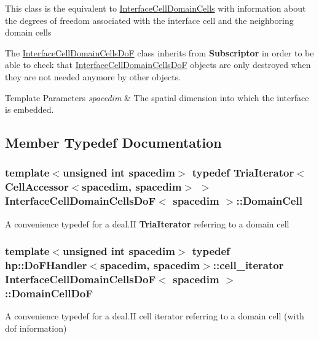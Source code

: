 This class is the equivalent to \hyperlink{class_interface_cell_domain_cells}{Interface\+Cell\+Domain\+Cells} with information about the degrees of freedom associated with the interface cell and the neighboring domain cells

The \hyperlink{class_interface_cell_domain_cells_do_f}{Interface\+Cell\+Domain\+Cells\+DoF} class inherits from {\bf Subscriptor} in order to be able to check that \hyperlink{class_interface_cell_domain_cells_do_f}{Interface\+Cell\+Domain\+Cells\+DoF} objects are only destroyed when they are not needed anymore by other objects.


\begin{DoxyTemplParams}{Template Parameters}
{\em spacedim} & The spatial dimension into which the interface is embedded. \\
\hline
\end{DoxyTemplParams}


\subsection{Member Typedef Documentation}
\subsubsection[{\texorpdfstring{Domain\+Cell}{DomainCell}}]{\setlength{\rightskip}{0pt plus 5cm}template$<$unsigned int spacedim$>$ typedef {\bf Tria\+Iterator}$<${\bf Cell\+Accessor}$<$spacedim, spacedim$>$ $>$ {\bf Interface\+Cell\+Domain\+Cells\+DoF}$<$ spacedim $>$\+::{\bf Domain\+Cell}}\hypertarget{class_interface_cell_domain_cells_do_f_a0d0b12a444adb340e1ffc2dd23d77902}{}\label{class_interface_cell_domain_cells_do_f_a0d0b12a444adb340e1ffc2dd23d77902}
A convenience typedef for a deal.\+II {\bf Tria\+Iterator} referring to a domain cell 
\subsubsection[{\texorpdfstring{Domain\+Cell\+DoF}{DomainCellDoF}}]{\setlength{\rightskip}{0pt plus 5cm}template$<$unsigned int spacedim$>$ typedef {\bf hp\+::\+Do\+F\+Handler}$<$spacedim, spacedim$>$\+::{\bf cell\+\_\+iterator} {\bf Interface\+Cell\+Domain\+Cells\+DoF}$<$ spacedim $>$\+::{\bf Domain\+Cell\+DoF}}\hypertarget{class_interface_cell_domain_cells_do_f_a464c96faf99349555566e4e469fdd34e}{}\label{class_interface_cell_domain_cells_do_f_a464c96faf99349555566e4e469fdd34e}
A convenience typedef for a deal.\+II cell iterator referring to a domain cell (with dof information) 
